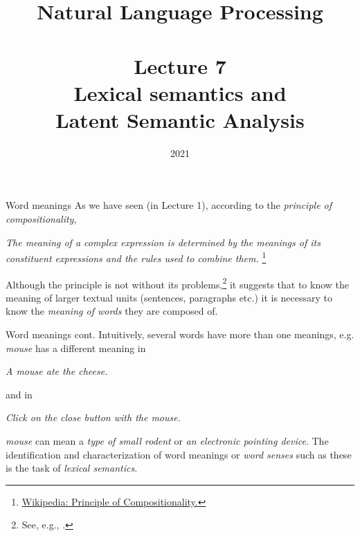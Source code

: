 \documentclass[style=upen, size=14pt]{powerdot}
\newcommand{\gold}{\color{arany}}
\theoremstyle{definition}
\begin{document}
\title{Natural Language Processing\\~~\\Lecture 7\\Lexical semantics and\\ Latent
  Semantic Analysis}

\date{2021}
\maketitle

\begin{slide}{Word meanings}
  As we have seen (in Lecture 1), according to the \emph{\gold principle of
    compositionality},\medskip
  
  \emph{The meaning of a complex expression is determined by the meanings of its
    constituent expressions and the rules used to combine them.}
  \footnote{\href{https://en.wikipedia.org/wiki/Principle_of_compositionality}{Wikipedia:
      Principle of Compositionality.}}\medskip

  Although the principle is not without its problems,\footnote{See, e.g.,
    \cite{sep-compositionality}.} it suggests that to know the meaning of larger
  textual units (sentences, paragraphs etc.) it is necessary to know the
  \emph{\gold meaning of words} they are composed of.
\end{slide}

\begin{slide}[toc=]{Word meanings cont.}
  Intuitively, several words have more than one meanings, e.g. \emph{mouse} has
  a different meaning in\bigskip

  \emph{A {\gold mouse} ate the cheese.}\medskip
  
  and in\medskip

  \emph{Click on the close button with the {\gold mouse}.}\bigskip

  \emph{mouse} can mean a \emph{type of small rodent} or \emph{an electronic
    pointing device}. The identification and characterization of word meanings
  or \emph{\gold word senses} such as these is the task of \emph{\gold lexical
    semantics}.
\end{slide}
\end{document}
